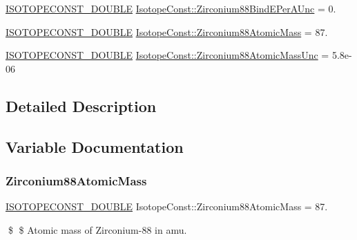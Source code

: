 \begin{DoxyCompactItemize}
\mbox{\hyperlink{group___isotope_const-_macros_ga8f45a7272ce02c0b4c65c44636ed719a}{I\+S\+O\+T\+O\+P\+E\+C\+O\+N\+S\+T\+\_\+\+D\+O\+U\+B\+LE}} \mbox{\hyperlink{group___isotope_const-_zirconium-_zr88_gad5a038a21780613b9d58e1567e76d09f}{Isotope\+Const\+::\+Zirconium88\+Bind\+E\+Per\+A\+Unc}} = 0.
\item 
\mbox{\hyperlink{group___isotope_const-_macros_ga8f45a7272ce02c0b4c65c44636ed719a}{I\+S\+O\+T\+O\+P\+E\+C\+O\+N\+S\+T\+\_\+\+D\+O\+U\+B\+LE}} \mbox{\hyperlink{group___isotope_const-_zirconium-_zr88_ga32d98b9b1a3e7134134a84d00b23d612}{Isotope\+Const\+::\+Zirconium88\+Atomic\+Mass}} = 87.
\item 
\mbox{\hyperlink{group___isotope_const-_macros_ga8f45a7272ce02c0b4c65c44636ed719a}{I\+S\+O\+T\+O\+P\+E\+C\+O\+N\+S\+T\+\_\+\+D\+O\+U\+B\+LE}} \mbox{\hyperlink{group___isotope_const-_zirconium-_zr88_ga61bcaff5f06352b7b81186506a334091}{Isotope\+Const\+::\+Zirconium88\+Atomic\+Mass\+Unc}} = 5.\+8e-\/06
\end{DoxyCompactItemize}


\subsection{Detailed Description}


\subsection{Variable Documentation}
\mbox{\label{group___isotope_const-_zirconium-_zr88_ga32d98b9b1a3e7134134a84d00b23d612}} 
\subsubsection{\texorpdfstring{Zirconium88\+Atomic\+Mass}{Zirconium88AtomicMass}}
{\footnotesize\ttfamily \mbox{\hyperlink{group___isotope_const-_macros_ga8f45a7272ce02c0b4c65c44636ed719a}{I\+S\+O\+T\+O\+P\+E\+C\+O\+N\+S\+T\+\_\+\+D\+O\+U\+B\+LE}} Isotope\+Const\+::\+Zirconium88\+Atomic\+Mass = 87.}

\$ \$ Atomic mass of Zirconium-\/88 in amu. \mbox{\label{group___isotope_const-_zirconium-_zr88_ga61bcaff5f06352b7b81186506a334091}} 
